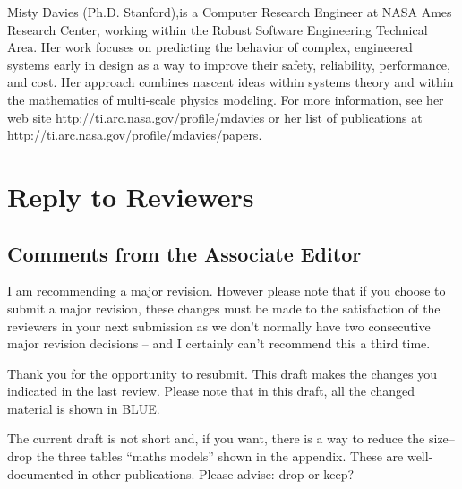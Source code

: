 \documentclass[10pt,journal,compsoc]{IEEEtran}
\newenvironment{changed}{\par\color{MyDarkBlue}}{\par}
\begin{document}
\begin{IEEEbiography}{Misty Davies}
(Ph.D. Stanford),is a Computer Research Engineer at
  NASA Ames Research Center, working within the
  Robust Software Engineering Technical Area.  Her
  work focuses on predicting the behavior of
  complex, engineered systems early in design as a
  way to improve their safety, reliability,
  performance, and cost. Her approach combines
  nascent ideas within systems theory and within the
  mathematics of multi-scale physics modeling.
For more information, see her web site http://ti.arc.nasa.gov/profile/mdavies
or her  list of publications at
http://ti.arc.nasa.gov/profile/mdavies/papers.
\end{IEEEbiography}



\clearpage
 \setcounter{page}{1}
\section*{Reply to Reviewers}
\subsection*{Comments from the Associate Editor}

 I am recommending a major revision.  However please note that if you choose to submit a major revision, these changes must be made to the satisfaction of the reviewers in your next submission as we don't normally have two consecutive major revision decisions -- and I certainly can't recommend this a third time.
\begin{changed}
Thank you for the opportunity to resubmit. 
This draft makes the changes you indicated in the last review.
Please note that in this draft, all the changed material is shown in BLUE.

The current draft is not short and, if you want,
there is a way to reduce the size-- drop the three
tables ``maths models'' shown in the appendix. These
are well-documented in other publications.  Please
advise: drop or keep?
\end{changed}
\end{document}
